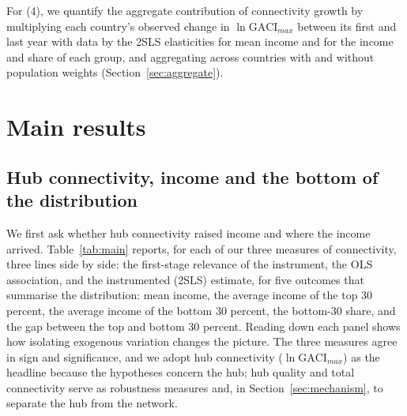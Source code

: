 For (4), we quantify the aggregate contribution of connectivity growth by multiplying each country's observed change in $\ln\mathrm{GACI}_{max}$ between its first and last year with data by the 2SLS elasticities for mean income and for the income and share of each group, and aggregating across countries with and without population weights (Section~\ref{sec:aggregate}).

\section{Main results}
\label{sec:results}
\subsection{Hub connectivity, income and the bottom of the distribution}
\label{sec:headline}
We first ask whether hub connectivity raised income and where the income arrived. Table~\ref{tab:main} reports, for each of our three measures of connectivity, three lines side by side: the first-stage relevance of the instrument, the OLS association, and the instrumented (2SLS) estimate, for five outcomes that summarise the distribution: mean income, the average income of the top 30 percent, the average income of the bottom 30 percent, the bottom-30 share, and the gap between the top and bottom 30 percent. Reading down each panel shows how isolating exogenous variation changes the picture. The three measures agree in sign and significance, and we adopt hub connectivity ($\ln\mathrm{GACI}_{max}$) as the headline because the hypotheses concern the hub; hub quality and total connectivity serve as robustness measures and, in Section~\ref{sec:mechanism}, to separate the hub from the network.



